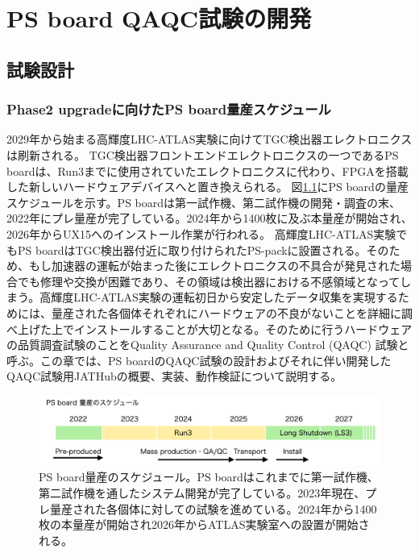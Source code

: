 \chapter{PS board QAQC試験の開発}
\label{chap_QAQC}

\section{試験設計}
\label{sec_QAQCdesign}
\subsection{Phase2 upgradeに向けたPS board量産スケジュール}
\label{subsec_PSBschedule}
2029年から始まる高輝度LHC-ATLAS実験に向けてTGC検出器エレクトロニクスは刷新される。
TGC検出器フロントエンドエレクトロニクスの一つであるPS boardは、Run3までに使用されていたエレクトロニクスに代わり、FPGAを搭載した新しいハードウェアデバイスへと置き換えられる。
図\ref{PSBschedule}にPS boardの量産スケジュールを示す。PS boardは第一試作機、第二試作機の開発・調査の末、2022年にプレ量産が完了している。2024年から1400枚に及ぶ本量産が開始され、2026年からUX15へのインストール作業が行われる。
高輝度LHC-ATLAS実験でもPS boardはTGC検出器付近に取り付けられたPS-packに設置される。そのため、もし加速器の運転が始まった後にエレクトロニクスの不具合が発見された場合でも修理や交換が困難であり、その領域は検出器における不感領域となってしまう。高輝度LHC-ATLAS実験の運転初日から安定したデータ収集を実現するためには、量産された各個体それぞれにハードウェアの不良がないことを詳細に調べ上げた上でインストールすることが大切となる。そのために行うハードウェアの品質調査試験のことをQuality Assurance and Quality Control (QAQC) 試験と呼ぶ。この章では、PS boardのQAQC試験の設計およびそれに伴い開発したQAQC試験用JATHubの概要、実装、動作検証について説明する。

\begin{figure} 
\centering
\includegraphics[width=16cm]{fig/QAQC/PSBschedule.png}
\caption[PS board量産のスケジュール]{PS board量産のスケジュール。PS boardはこれまでに第一試作機、第二試作機を通したシステム開発が完了している。2023年現在、プレ量産された各個体に対しての試験を進めている。2024年から1400枚の本量産が開始され2026年からATLAS実験室への設置が開始される。}
\label{PSBschedule}
\end{figure}

